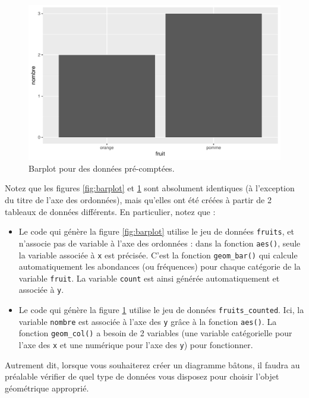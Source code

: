 \documentclass[a4paperpaper,]{article}
\providecommand{\tightlist}{%
  \setlength{\itemsep}{0pt}\setlength{\parskip}{0pt}}
\begin{document}
\begin{figure}[htpb]

{\centering \includegraphics[width=0.9\linewidth]{figure/barplotcol-1} 

}

\caption{Barplot pour des données pré-comptées.}\label{fig:barplotcol}
\end{figure}

Notez que les figures \ref{fig:barplot} et \ref{fig:barplotcol} sont absolument identiques (à l'exception du titre de l'axe des ordonnées), mais qu'elles ont été créées à partir de 2 tableaux de données différents. En particulier, notez que :

\begin{itemize}
\tightlist
\item
  Le code qui génère la figure \ref{fig:barplot} utilise le jeu de données \texttt{fruits}, et n'associe pas de variable à l'axe des ordonnées : dans la fonction \texttt{aes()}, seule la variable associée à \texttt{x} est précisée. C'est la fonction \texttt{geom\_bar()} qui calcule automatiquement les abondances (ou fréquences) pour chaque catégorie de la variable \texttt{fruit}. La variable \texttt{count} est ainsi générée automatiquement et associée à \texttt{y}.
\item
  Le code qui génère la figure \ref{fig:barplotcol} utilise le jeu de données \texttt{fruits\_counted}. Ici, la variable \texttt{nombre} est associée à l'axe des \texttt{y} grâce à la fonction \texttt{aes()}. La fonction \texttt{geom\_col()} a besoin de 2 variables (une variable catégorielle pour l'axe des \texttt{x} et une numérique pour l'axe des \texttt{y}) pour fonctionner.
\end{itemize}

Autrement dit, lorsque vous souhaiterez créer un diagramme bâtons, il faudra au préalable vérifier de quel type de données vous disposez pour choisir l'objet géométrique approprié.
\end{document}
